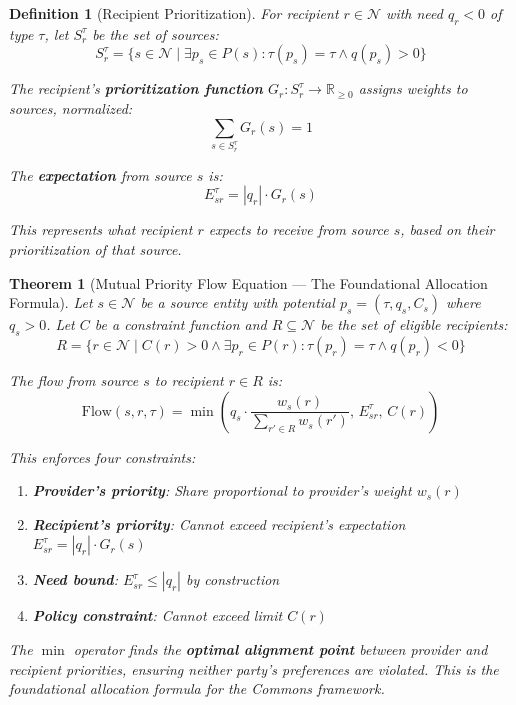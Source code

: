 \documentclass[11pt]{article}
\newtheorem{definition}{Definition}
\newtheorem{theorem}{Theorem}
\begin{document}
\begin{definition}[Recipient Prioritization]
For recipient $r \in \mathcal{N}$ with need $q_r < 0$ of type $\tau$, let $S_r^\tau$ be the set of sources:
\[
S_r^\tau = \{ s \in \mathcal{N} \mid \exists p_s \in P(s): \tau(p_s) = \tau \land q(p_s) > 0 \}
\]

The recipient's \textbf{prioritization function} $G_r: S_r^\tau \to \mathbb{R}_{\geq 0}$ assigns weights to sources, normalized:
\[
\sum_{s \in S_r^\tau} G_r(s) = 1
\]

The \textbf{expectation} from source $s$ is:
\[
E_{sr}^\tau = |q_r| \cdot G_r(s)
\]

This represents what recipient $r$ expects to receive from source $s$, based on their prioritization of that source.
\end{definition}

\begin{theorem}[Mutual Priority Flow Equation — The Foundational Allocation Formula]
\label{thm:dual-priority-flow}
Let $s \in \mathcal{N}$ be a source entity with potential $p_s = (\tau, q_s, C_s)$ where $q_s > 0$. Let $C$ be a constraint function and $R \subseteq \mathcal{N}$ be the set of eligible recipients:
\[
R = \{ r \in \mathcal{N} \mid C(r) > 0 \land \exists p_r \in P(r): \tau(p_r) = \tau \land q(p_r) < 0 \}
\]

The flow from source $s$ to recipient $r \in R$ is:
\[
\boxed{\text{Flow}(s, r, \tau) = \min\left( q_s \cdot \frac{w_s(r)}{\sum_{r' \in R} w_s(r')}, \, E_{sr}^\tau, \, C(r) \right)}
\]

This enforces four constraints:
\begin{enumerate}
\item \textbf{Provider's priority}: Share proportional to provider's weight $w_s(r)$
\item \textbf{Recipient's priority}: Cannot exceed recipient's expectation $E_{sr}^\tau = |q_r| \cdot G_r(s)$
\item \textbf{Need bound}: $E_{sr}^\tau \leq |q_r|$ by construction
\item \textbf{Policy constraint}: Cannot exceed limit $C(r)$
\end{enumerate}

The $\min$ operator finds the \textbf{optimal alignment point} between provider and recipient priorities, ensuring neither party's preferences are violated. This is the foundational allocation formula for the Commons framework.
\end{theorem}
\end{document}
